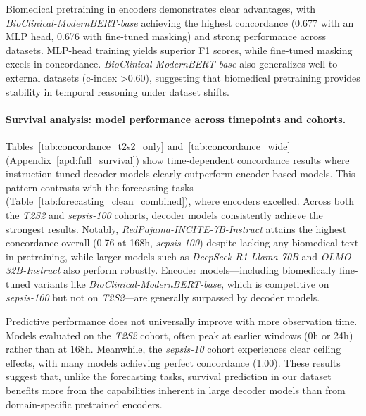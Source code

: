 \documentclass[letterpaper]{article} %
\begin{document}
Biomedical pretraining in encoders demonstrates clear advantages, with \textit{BioClinical-ModernBERT-base} achieving the highest concordance (0.677 with an MLP head, 0.676 with fine-tuned masking) and strong performance across datasets. MLP-head training yields superior F1 scores, while fine-tuned masking excels in concordance. \textit{BioClinical-ModernBERT-base} also generalizes well to external datasets (c-index \textgreater0.60), suggesting that biomedical pretraining provides stability in temporal reasoning under dataset shifts.

\paragraph{Survival analysis: model performance across timepoints and cohorts.}
Tables~\ref{tab:concordance_t2s2_only} and~\ref{tab:concordance_wide} (Appendix~\ref{apd:full_survival}) show time-dependent concordance results where 
instruction-tuned decoder models clearly outperform encoder-based models. This pattern contrasts with the forecasting tasks (Table~\ref{tab:forecasting_clean_combined}), where encoders excelled. Across both the \textit{T2S2} and \textit{sepsis-100} cohorts, decoder models consistently achieve the strongest results. Notably, \textit{RedPajama-INCITE-7B-Instruct} attains the highest concordance overall (0.76 at 168h, \textit{sepsis-100}) despite lacking any biomedical text in pretraining, while larger models such as \textit{DeepSeek-R1-Llama-70B} and \textit{OLMO-32B-Instruct} also perform robustly. Encoder models---including biomedically fine-tuned variants like \textit{BioClinical-ModernBERT-base}, which is competitive on \textit{sepsis-100} but not on \textit{T2S2}---are generally surpassed by decoder models.

Predictive performance does not universally improve with more observation time. Models evaluated on the \textit{T2S2} cohort, often peak at earlier windows (0h or 24h) rather than at 168h. Meanwhile, the \textit{sepsis-10} cohort experiences clear ceiling effects, with many models achieving perfect concordance (1.00). These results suggest that, unlike the forecasting tasks, survival prediction in our dataset benefits more from the capabilities inherent in large decoder models than from domain-specific pretrained encoders.
\end{document}
